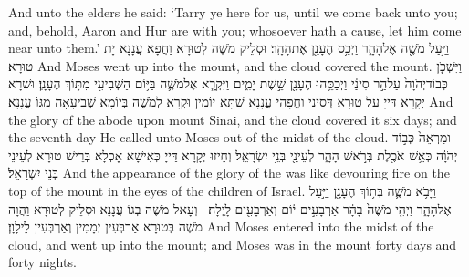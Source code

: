 {And unto the elders he said: ‘Tarry ye here for us, until we come back unto you; and, behold, Aaron and Hur are with you; whosoever hath a cause, let him come near unto them.’}{}
{וַיַּ֥עַל מֹשֶׁ֖ה אֶל\maqqaf הָהָ֑ר וַיְכַ֥ס הֶעָנָ֖ן אֶת\maqqaf הָהָֽר׃}
{וּסְלֵיק מֹשֶׁה לְטוּרָא וַחֲפָא עֲנָנָא יָת טוּרָא׃}
{And Moses went up into the mount, and the cloud covered the mount.}{}
{וַיִּשְׁכֹּ֤ן כְּבוֹד\maqqaf יְהֹוָה֙ עַל\maqqaf הַ֣ר סִינַ֔י וַיְכַסֵּ֥הוּ הֶעָנָ֖ן שֵׁ֣שֶׁת יָמִ֑ים וַיִּקְרָ֧א אֶל\maqqaf מֹשֶׁ֛ה בַּיּ֥וֹם הַשְּׁבִיעִ֖י מִתּ֥וֹךְ הֶעָנָֽן׃}
{וּשְׁרָא יְקָרָא דַּייָ עַל טוּרָא דְּסִינַי וַחֲפָהִי עֲנָנָא שִׁתָּא יוֹמִין וּקְרָא לְמֹשֶׁה בְּיוֹמָא שְׁבִיעָאָה מִגּוֹ עֲנָנָא׃}
{And the glory of the \lord\space abode upon mount Sinai, and the cloud covered it six days; and the seventh day He called unto Moses out of the midst of the cloud.}{}
{וּמַרְאֵה֙ כְּב֣וֹד יְהֹוָ֔ה כְּאֵ֥שׁ אֹכֶ֖לֶת בְּרֹ֣אשׁ הָהָ֑ר לְעֵינֵ֖י בְּנֵ֥י יִשְׂרָאֵֽל׃}
{וְחֵיזוּ יְקָרָא דַּייָ כְּאִישָׁא אָכְלָא בְּרֵישׁ טוּרָא לְעֵינֵי בְּנֵי יִשְׂרָאֵל׃}
{And the appearance of the glory of the \lord\space was like devouring fire on the top of the mount in the eyes of the children of Israel.}{}
{וַיָּבֹ֥א מֹשֶׁ֛ה בְּת֥וֹךְ הֶעָנָ֖ן וַיַּ֣עַל אֶל\maqqaf הָהָ֑ר וַיְהִ֤י מֹשֶׁה֙ בָּהָ֔ר אַרְבָּעִ֣ים י֔וֹם וְאַרְבָּעִ֖ים לָֽיְלָה׃ \petucha }
{וְעָאל מֹשֶׁה בְּגוֹ עֲנָנָא וּסְלֵיק לְטוּרָא וַהֲוָה מֹשֶׁה בְּטוּרָא אַרְבְּעִין יְמָמִין וְאַרְבְּעִין לֵילָוָן׃}
{And Moses entered into the midst of the cloud, and went up into the mount; and Moses was in the mount forty days and forty nights.}{}
